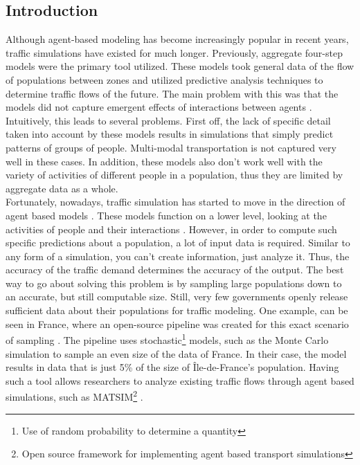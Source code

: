 \documentclass[11pt]{article}
\begin{document}
\begin{multicols}{2}
    \section{Introduction}
    \quad Although agent-based modeling has become increasingly popular in recent years, traffic simulations have existed for much longer. Previously, aggregate four-step models were the primary tool utilized. These models took general data of the flow of populations between zones and utilized predictive analysis techniques to determine traffic flows of the future. The main problem with this was that the models did not capture emergent effects of interactions between agents \cite{types-of-modeling}. Intuitively, this leads to several problems. First off, the lack of specific detail taken into account by these models results in simulations that simply predict patterns of groups of people. Multi-modal transportation is not captured very well in these cases. In addition, these models also don't work well with the variety of activities of different people in a population, thus they are limited by aggregate data as a whole. \\

    \quad Fortunately, nowadays, traffic simulation has started to move in the direction of agent based models \cite{ile-de-france}. These models function on a lower level, looking at the activities of people and their interactions \cite{agent-based-model}. However, in order to compute such specific predictions about a population, a lot of input data is required. Similar to any form of a simulation, you can't create information, just analyze it. Thus, the accuracy of the traffic demand determines the accuracy of the output. The best way to go about solving this problem is by sampling large populations down to an accurate, but still computable size. Still, very few governments openly release sufficient data about their populations for traffic modeling. One example, can be seen in France, where an open-source pipeline was created for this exact scenario of sampling \cite{ile-de-france}. The pipeline uses stochastic\footnote{Use of random probability to determine a quantity} models, such as the Monte Carlo simulation to sample an even size of the data of France. In their case, the model results in data that is just 5\% of the size of Île-de-France's population. Having such a tool allows researchers to analyze existing traffic flows through agent based simulations, such as MATSIM\footnote{Open source framework for implementing agent based transport simulations} \cite{matsim}.\\


\end{multicols}
\end{document}

